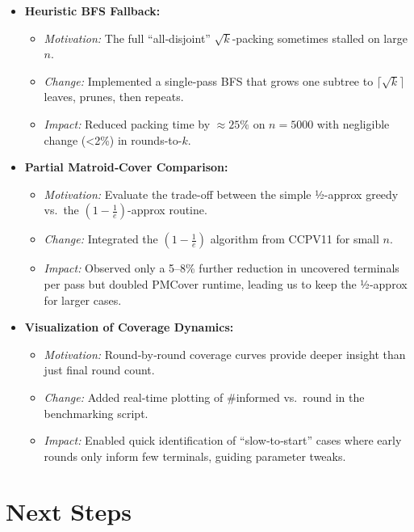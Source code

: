 \documentclass[11pt]{article}
\begin{document}
\begin{itemize}
  \item \textbf{Heuristic BFS Fallback:}
    \begin{itemize}
      \item \emph{Motivation:} The full “all‐disjoint” \(\sqrt{k}\)-packing sometimes stalled on large \(n\).  
      \item \emph{Change:} Implemented a single‐pass BFS that grows one subtree to \(\lceil\sqrt{k}\rceil\) leaves, prunes, then repeats.  
      \item \emph{Impact:} Reduced packing time by \(\approx25\%\) on \(n=5000\) with negligible change (<2\%) in rounds-to-\(k\).
    \end{itemize}

  \item \textbf{Partial Matroid‐Cover Comparison:}
    \begin{itemize}
      \item \emph{Motivation:} Evaluate the trade-off between the simple ½-approx greedy vs.\ the \((1-\tfrac1e)\)-approx routine.  
      \item \emph{Change:} Integrated the \((1-\tfrac1e)\) algorithm from CCPV11 for small \(n\).  
      \item \emph{Impact:} Observed only a 5--8\% further reduction in uncovered terminals per pass but doubled PMCover runtime, leading us to keep the ½-approx for larger cases.
    \end{itemize}

  \item \textbf{Visualization of Coverage Dynamics:}
    \begin{itemize}
      \item \emph{Motivation:} Round‐by‐round coverage curves provide deeper insight than just final round count.  
      \item \emph{Change:} Added real‐time plotting of \(\#\)informed vs.\ round in the benchmarking script.  
      \item \emph{Impact:} Enabled quick identification of “slow‐to‐start” cases where early rounds only inform few terminals, guiding parameter tweaks.
    \end{itemize}
\end{itemize}
\section{Next Steps}
\end{document}
